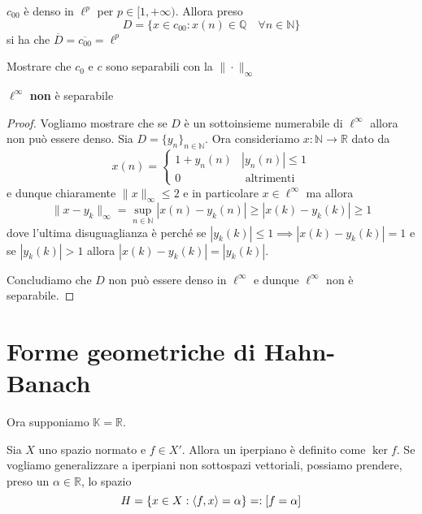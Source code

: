 \begin{example}{}
    \(c_{00} \) è denso in \(\ell^{p}\) per \(p \in [1, +\infty)\). Allora preso
    \[
        D = \{x \in c_{00} : x{(n)} \in \mathbb{Q} \quad \forall n \in \mathbb{N}\} 
    \]
    si ha che \(\overline{D} = \overline{c_{00}} = \ell^{p}\) 

\end{example}

\begin{eser}{}
    Mostrare che \(c_{0}\) e \(c\) sono separabili con la \(\|\cdot \|_{\infty}  \) 
\end{eser}

\begin{proposition}{}
    \(\ell^{\infty}\) \textbf{non} è separabile
\end{proposition}
\begin{proof}{}
    Vogliamo mostrare che se \(D\) è un sottoinsieme numerabile di \(\ell^{\infty}\) allora non può essere denso. Sia \(D = \{y_{n}\}_{n \in \mathbb{N}} \). Ora consideriamo \(
    x : \mathbb{N} \to \mathbb{R}\) dato da
    \[
      x{(n)} = \begin{cases}{}
          1 + y_n{(n)} & |y_n{(n)}| \le 1 \\
          0 & \text{ altrimenti }
      \end{cases}
    \]
    e dunque chiaramente \(\|x\|_{\infty}  \le 2\) e in particolare \(x \in \ell^{\infty}\) ma allora
    \[
      \|x - y_k\|_{\infty} = \sup_{n \in \mathbb{N}} |x{(n)} - y_k{(n)}| \ge
      |x{(k)} - y_k{(k)}| \ge 1
    \]
    dove l'ultima disuguaglianza è perché se
    \(|y_k{(k)}| \le 1 \implies |x{(k)} - y_k{(k)} | = 1\) e se
    \(|y_k{(k)}| > 1\) allora \(|x{(k)} - y_k{(k)}| = |y_k{(k)}|\).

    Concludiamo che \(D\) non può essere denso in \(\ell^{\infty}\) e dunque \(
    \ell^{\infty}\) non è separabile.
\end{proof}

\section{Forme geometriche di Hahn-Banach}
Ora supponiamo \( \mathbb{K} = \mathbb{R}\).

Sia \(X\) uno spazio normato e \(f \in X'\). Allora un iperpiano è definito come
\(\ker f\). Se vogliamo generalizzare a iperpiani non sottospazi vettoriali,
possiamo prendere, preso un \(\alpha \in \mathbb{R}\), lo spazio
\[
    H = \{x \in X : {\left\langle f, x\right\rangle} = \alpha\} =: [f = \alpha]
\]

